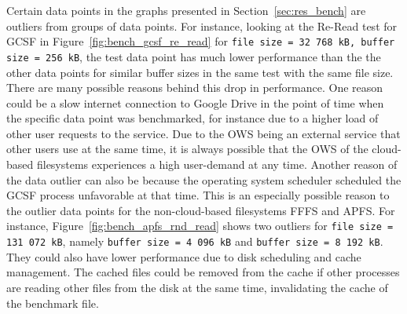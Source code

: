 Certain data points in the graphs presented in Section~\ref{sec:res_bench} are outliers from groups of data points. For instance, looking at the \mbox{Re-Read} test for \gls{GCSF} in Figure~\ref{fig:bench_gcsf_re_read} for \texttt{file size = 32\,768\,kB, buffer size = 256\,kB}, the test data point has much lower performance than the the other data points for similar buffer sizes in the same test with the same file size. There are many possible reasons behind this drop in performance. One reason could be a slow internet connection to Google Drive in the point of time when the specific data point was benchmarked, for instance due to a higher load of other user requests to the service. Due to the \gls{OWS} being an external service that other users use at the same time, it is always possible that the \gls{OWS} of the \mbox{cloud-based} filesystems experiences a high \mbox{user-demand} at any time. Another reason of the data outlier can also be because the operating system scheduler scheduled the \gls{GCSF} process unfavorable at that time. This is an especially possible reason to the outlier data points for the \mbox{non-cloud-based} filesystems \gls{FFFS} and \gls{APFS}. For instance, Figure~\ref{fig:bench_apfs_rnd_read} shows two outliers for \texttt{file size = 131\,072\,kB}, namely \texttt{buffer size = 4\,096\,kB} and \texttt{buffer size = 8\,192\,kB}. They could also have lower performance due to disk scheduling and cache management. The cached files could be removed from the cache if other processes are reading other files from the disk at the same time, invalidating the cache of the benchmark file.

